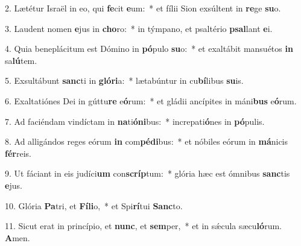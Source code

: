 2. Lætétur Israël in eo, qui \textbf{fe}cit \textbf{e}um:~*  et fílii Sion exsúltent in \textbf{re}ge \textbf{su}o.\

3. Laudent nomen \textbf{e}jus in \textbf{cho}ro:~*  in týmpano, et psaltério \textbf{psal}lant \textbf{e}i.\

4. Quia beneplácitum est Dómino in \textbf{pó}pulo \textbf{su}o:~*  et exaltábit mansuétos \textbf{in} sa\textbf{lú}tem.\

5. Exsultábunt \textbf{sanc}ti in \textbf{gló}\textbf{ri}a:~*  lætabúntur in cu\textbf{bí}libus \textbf{su}is.\

6. Exaltatiónes Dei in gúttu\textbf{re} e\textbf{ó}rum:~*  et gládii ancípites in máni\textbf{bus} e\textbf{ó}rum.\

7. Ad faciéndam vindíctam in \textbf{na}ti\textbf{ó}\textbf{ni}bus:~*  increpati\textbf{ó}nes in \textbf{pó}pulis.\

8. Ad alligándos reges eórum \textbf{in} com\textbf{pé}\textbf{di}bus:~*  et nóbiles eórum in \textbf{má}nicis \textbf{fér}reis.\

9. Ut fáciant in eis judíci\textbf{um} con\textbf{scríp}tum:~*  glória hæc est ómnibus \textbf{sanc}tis \textbf{e}jus.\

10. Glória \textbf{Pa}tri, et \textbf{Fí}\textbf{li}o,~*  et Spi\textbf{rí}tui \textbf{Sanc}to.\

11. Sicut erat in princípio, et \textbf{nunc}, et \textbf{sem}per,~*  et in sǽcula sæcu\textbf{ló}rum. \textbf{A}men.\

